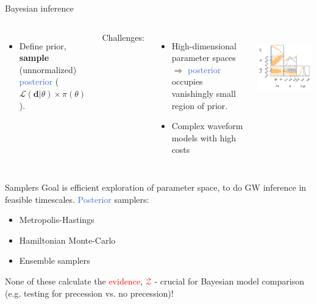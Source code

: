 \documentclass[aspectratio=169, 11pt]{beamer}
\begin{document}
\begin{frame}{Bayesian inference}
\begin{columns}
    
\begin{itemize}
    \item Define \textcolor{BurntOrange}{prior}, \textbf{sample} (unnormalized) \textcolor{RoyalBlue}{posterior} ($\mathcal{L}(\textbf{d} | \theta) \times \pi(\theta)$).
\end{itemize}
\vspace{2em}
\raggedright
Challenges:\vfill
    \begin{itemize}
        \item High-dimensional parameter spaces $\Rightarrow$ \textcolor{RoyalBlue}{posterior} occupies vanishingly small region of \textcolor{BurntOrange}{prior}.
        \item Complex waveform models with high costs
    \end{itemize}
    \vfill 

\
\vspace{-2em}
\centering
\includegraphics[]{Ca_Foscari Beamer/presentation_triangleplot.pdf}
\end{columns}
\end{frame}

\begin{frame}{Samplers}\vfill
Goal is efficient exploration of parameter space, to do GW inference in feasible timescales. 
\vfill  
    \textcolor{RoyalBlue}{Posterior} samplers:
    \begin{itemize}
        \item Metropolis-Hastings 
        \item Hamiltonian Monte-Carlo
        \item Ensemble samplers
    \end{itemize}
    \vfill
    None of these calculate the \textcolor{red}{evidence}, \textcolor{red}{$\mathcal{Z}$} - crucial for Bayesian model comparison (e.g. testing for precession vs. no precession)!  
\end{frame}
\end{document}
